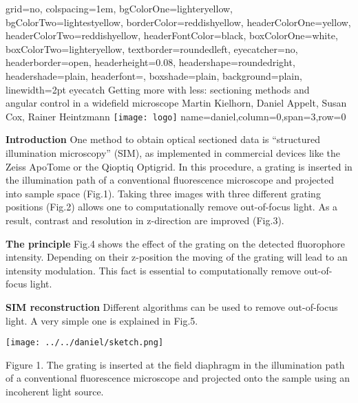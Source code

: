 \documentclass[portrait,final]{baposter}
\begin{document}
\begin{poster}{%
    grid=no,
    colspacing=1em,
    bgColorOne=lighteryellow,
    bgColorTwo=lightestyellow,
    borderColor=reddishyellow,
    headerColorOne=yellow,
    headerColorTwo=reddishyellow,
    headerFontColor=black,
    boxColorOne=white, %
    boxColorTwo=lighteryellow,
    textborder=roundedleft,
    eyecatcher=no,
    headerborder=open,
    headerheight=0.08\textheight,
    headershape=roundedright,
    headershade=plain,
    headerfont=\Large\textsf, %
    boxshade=plain,
    background=plain,
    linewidth=2pt}
  {eyecatch} 
  {Getting more with less: sectioning methods and \\ angular
    control in a widefield microscope} 
  {Martin Kielhorn, Daniel Appelt, Susan Cox, Rainer Heintzmann} {
    \texttt{[image: logo]}
  }
  {name=daniel,column=0,span=3,row=0}{
    {}
\begin{multicols}{3}
    {\bf Introduction}
    One method to obtain optical sectioned data is ``structured
    illumination microscopy'' (SIM), as implemented in commercial
    devices like the Zeiss ApoTome or the Qioptiq Optigrid. In this
    procedure, a grating is inserted in the illumination path of a
    conventional fluorescence microscope and projected into sample
    space (Fig.1). Taking three images with three different grating
    positions (Fig.2) allows one to computationally remove
    out-of-focus light. As a result, contrast and resolution in
    z-direction are improved (Fig.3).

    {\bf The principle} Fig.4 shows the effect of the grating on the
    detected fluorophore intensity. Depending on their z-position the
    moving of the grating will lead to an intensity modulation. This
    fact is essential to computationally remove out-of-focus light.

    {\bf SIM reconstruction} Different algorithms can be used to
    remove out-of-focus light. A very simple one is explained in
    Fig.5.

    \begin{minipage}[h]{7.5cm}
      \begin{center}
      \texttt{[image: ../../daniel/sketch.png]}
      \end{center}
      {\smaller Figure 1. The grating is inserted at the field
        diaphragm in the illumination path of a conventional
        fluorescence microscope and projected onto the sample using an
        incoherent light source.}
    \end{minipage}
    

\end{multicols}}
\end{poster}
\end{document}
